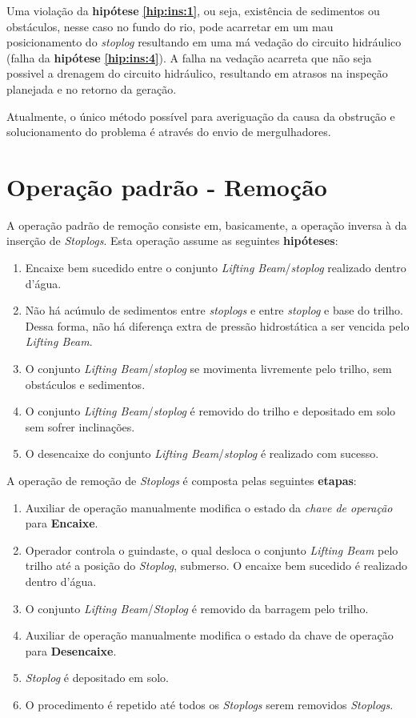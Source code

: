 Uma violação da \textbf{hipótese} \textbf{\ref{hip:ins:1}}, ou seja, existência
de sedimentos ou obstáculos, nesse caso no fundo do rio, pode acarretar em um mau posicionamento do
\emph{stoplog} resultando em uma má vedação do circuito hidráulico (falha da \textbf{hipótese} \textbf{\ref{hip:ins:4}}).  A falha na vedação acarreta que não seja possivel a drenagem do circuito hidráulico, resultando em atrasos na inspeção planejada e no retorno da geração. 

Atualmente, o único método possível para averiguação da causa da obstrução e solucionamento do problema é através do envio de mergulhadores.  




\section{Operação padrão - Remoção}
A operação padrão de remoção consiste em, basicamente, a operação inversa à da inserção de \emph{Stoplogs}. Esta operação assume as seguintes \textbf{hipóteses}:

\begin{enumerate}
\item Encaixe bem sucedido entre o conjunto \emph{Lifting Beam}/\emph{stoplog}
realizado dentro d'água.
\item Não há acúmulo de sedimentos entre \emph{stoplogs} e entre \emph{stoplog} e base do trilho. Dessa forma, não há diferença extra de pressão hidrostática a ser vencida pelo \emph{Lifting Beam}.
\label{hip:rem:2}
\item O conjunto \emph{Lifting Beam}/\emph{stoplog} se movimenta livremente pelo trilho, sem obstáculos e sedimentos.
\item O conjunto \emph{Lifting Beam}/\emph{stoplog} é removido do trilho e depositado em solo sem sofrer inclinações.  
\item O desencaixe do conjunto \emph{Lifting Beam}/\emph{stoplog} é realizado com sucesso.
\end{enumerate}

A operação de remoção de \emph{Stoplogs} é composta pelas seguintes \textbf{etapas}:
\begin{enumerate}
\item Auxiliar de operação manualmente modifica o estado da \emph{chave de operação} para \textbf{Encaixe}.
\item Operador controla o guindaste, o qual desloca o conjunto \emph{Lifting
Beam} pelo trilho até a posição do \emph{Stoplog}, submerso. O encaixe bem
sucedido é realizado dentro d'água.
\item O conjunto \emph{Lifting Beam}/\emph{Stoplog} é removido da barragem pelo trilho. 
\item Auxiliar de operação manualmente modifica o estado da chave de operação para \textbf{Desencaixe}.
\item \emph{Stoplog} é depositado em solo.
\item O procedimento é repetido até todos os \emph{Stoplogs} serem removidos
\emph{Stoplogs}.
\end{enumerate}

